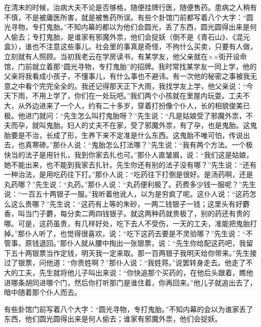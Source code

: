 \documentclass[12pt,UTF8]{ctexbook}
\begin{document}
在清末的时候，治病大夫不论是否够格，随便挂牌行医，随便售药。患病之人稍有不慎，不是被庸医所害，就是被售药所误。有些个卦馆门前都写着八个大字：“圆光寻物，专打鬼胎。”不知内幕的都以为他们会圆光，丢了东西，圆光圆得出来是何人偷去；专打鬼胎，是谁家有邪魔外祟，他们会捉妖（倒不是《青石山》、《混元盒》），谁也不注意这些事儿。社会里的事真是奇怪，不拘什么买卖，只要有人做，立刻就有人照顾。当初我老云在学房读书，有某学友，他父亲就在××街开设命馆，门前就立着那“圆光寻物，专打鬼胎”的招牌。我时常找某学友一同上学，他的父亲将我看成小孩子，不懂事儿，有什么事也不避讳。有一次他的秘密之事被我无意之中看个完完全全的。我还记得那天正下大雨，我找学友上学，他父亲说：“今天下雨，不用上学了，你们在一处玩吧。”我们两个小孩就在里屋内玩耍。工夫不大，从外边进来了一个人，约有二十多岁，穿着打扮像个仆人，长的相貌俊美已极。他进门就问：“先生怎么叫打鬼胎呀？”先生说：“凡是姑娘受了邪魔外祟，不夫而孕，就叫鬼胎。妇人的丈夫不在家，受了邪魔外祟，有了孕，也是鬼胎。这鬼胎要是不治，长成了形，生养下来不定准是什么东西。这鬼胎不唯可怕，传说出去，也真寒碜。”那仆人说：“鬼胎怎么打法哪？”先生说：“我有两个方法。一个极快当的法子是用针扎，我到你家去扎也可。”那仆人直皱眉，说：“我们这是姑娘，她不能出来，也不能到我家去扎针。先生你还有别的法子没有哪？”先生说：“还有一种治法，是用吃药往下打。”那仆人说：“吃药往下打倒是很好。是汤药啊，还是丸药哪？”先生说：“丸药。”那仆人说：“丸药便利极了。药费多少钱一服呢？”先生说：“一百五十两银子一服。”我听着他讹人，以为是穷疯了呢。这仆人说：“这药怎么这么贵哪？”先生说：“这药有上等的朱砂，一两二钱银子一钱；这里头有好麝香，叫当门子麝，每分卖二两四钱银子。就这两种药就贵极了，别的药还有贵的哪。可是，这药虽贵，有几样好处，吃下去人不受伤，一天的工夫，准能把鬼胎打掉。”那仆人听了，也觉得很喜欢，说：“吃下这药去要是不灵验哪？”先生说：“不管事，原钱退回。”那仆人就从腰中掏出一张银票，说：“先生你给配这药吧，我留下五十两银票当作定钱，明天我一定来取。那一百两银子我明天给你带来。”先生接过了银票，问他道：“你贵姓啊？”那仆人说：“我姓蒋。”说罢转身走去。他走了不大的工夫，先生就将他儿子叫出来说：“你快追那个买药的，在他后头跟着，瞧他进哪条胡同进哪个门，然后你打听那门是谁住着，你再回来。”他儿子就追出去了，暗中随着那个仆人而去。

有些卦馆门前写着八个大字：“圆光寻物，专打鬼胎。”不知内幕的会以为谁家丢了东西，他们圆光圆得出来是何人偷去；谁家有邪魔外祟，他们会捉妖。
\end{document}
